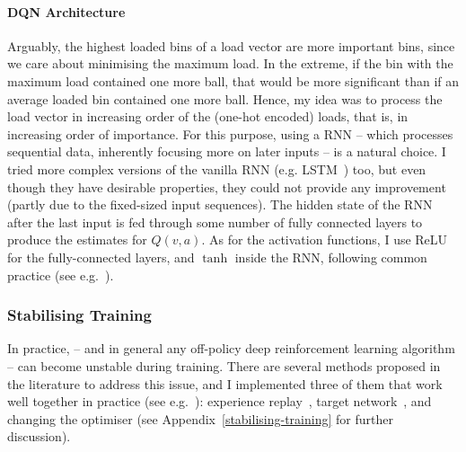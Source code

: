 \paragraph{DQN Architecture} Arguably, the highest loaded bins of a load vector are more important bins, since we care about minimising the maximum load. In the extreme, if the bin with the maximum load contained one more ball, that would be more significant than if an average loaded bin contained one more ball. Hence, my idea was to process the load vector in increasing order of the (one-hot encoded) loads, that is, in increasing order of importance. For this purpose, using a RNN -- which processes sequential data, inherently focusing more on later inputs -- is a natural choice. I tried more complex versions of the vanilla RNN (e.g. LSTM~\cite{shewalkar2019rnngrulstm}) too, but even though they have desirable properties, they could not provide any improvement (partly due to the fixed-sized input sequences). The hidden state of the RNN after the last input is fed through some number of fully connected layers to produce the estimates for $Q(v, a)$. As for the activation functions, I use ReLU for the fully-connected layers, and $\tanh$ inside the RNN, following common practice (see e.g.~\cite{szandala2020activationfunctions}).


\subsubsection*{Stabilising Training}


In practice, \DQL -- and in general any off-policy deep reinforcement learning algorithm -- can become unstable during training. There are several methods proposed in the literature to address this issue, and I implemented three of them that work well together in practice (see e.g.~\cite{mnih2015dqnstabilitycombined}): experience replay~\cite{lin1992experiencereplay}, target network~\cite{fan2020target}, and changing the optimiser (see Appendix~\ref{stabilising-training} for further discussion).


